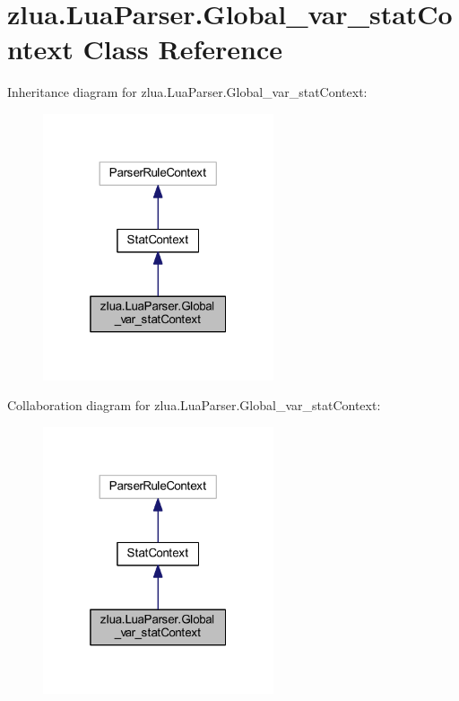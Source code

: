 \hypertarget{classzlua_1_1_lua_parser_1_1_global__var__stat_context}{}\section{zlua.\+Lua\+Parser.\+Global\+\_\+var\+\_\+stat\+Context Class Reference}
\label{classzlua_1_1_lua_parser_1_1_global__var__stat_context}


Inheritance diagram for zlua.\+Lua\+Parser.\+Global\+\_\+var\+\_\+stat\+Context\+:
\nopagebreak
\begin{figure}[H]
\begin{center}
\leavevmode
\includegraphics[width=193pt]{classzlua_1_1_lua_parser_1_1_global__var__stat_context__inherit__graph}
\end{center}
\end{figure}


Collaboration diagram for zlua.\+Lua\+Parser.\+Global\+\_\+var\+\_\+stat\+Context\+:
\nopagebreak
\begin{figure}[H]
\begin{center}
\leavevmode
\includegraphics[width=193pt]{classzlua_1_1_lua_parser_1_1_global__var__stat_context__coll__graph}
\end{center}
\end{figure}
